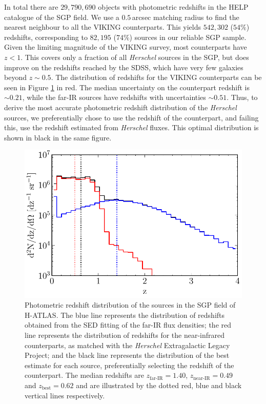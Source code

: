 In total there are $29,790,690$ objects with photometric redshifts in the HELP catalogue of the SGP field. We use a $0.5\,$arcsec matching radius to find the nearest neighbour to all the VIKING counterparts. This yields $542,302$ ($54\%$) redshifts, corresponding to $82,195$ ($74\%$) sources in our reliable SGP sample. Given the limiting magnitude of the VIKING survey, most counterparts have $z < 1$. This covers only a fraction of all \textit{Herschel} sources in the SGP, but does improve on the redshifts reached by the SDSS, which have very few galaxies beyond $z \sim 0.5$. The distribution of redshifts for the VIKING counterparts can be seen in Figure \ref{fig:redshift_distribution} in red. The median uncertainty on the counterpart redshift is $\sim 0.21$, while the far-IR sources have redshifts with uncertainties $\sim 0.51$. Thus, to derive the most accurate photometric redshift distribution of the \textit{Herschel} sources, we preferentially chose to use the redshift of the counterpart, and failing this, use the redshift estimated from \textit{Herschel} fluxes. This optimal distribution is shown in black in the same figure.

\begin{figure}
    \centering
    \includegraphics[width=0.75\columnwidth]{Figures/redshift_distribution.pdf}
    \caption[Photometric redshift distribution of SGP sources]{Photometric redshift distribution of the sources in the SGP field of H-ATLAS. The blue line represents the distribution of redshifts obtained from the SED fitting of the far-IR flux densities; the red line represents the distribution of redshifts for the near-infrared counterparts, as matched with the \textit{Herschel} Extragalactic Legacy Project; and the black line represents the distribution of the best estimate for each source, preferentially selecting the redshift of the counterpart. The median redshifts are $z_{\textrm{far-IR}} = 1.40$, $z_{\textrm{near-IR}} = 0.49$ and $z_{\textrm{best}} = 0.62$ and are illustrated by the dotted red, blue and black vertical lines respectively.}
    \label{fig:redshift_distribution}
\end{figure}

